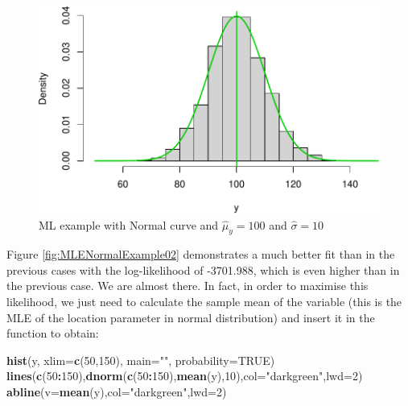 \documentclass[
]{book}
\newenvironment{Shaded}{\begin{snugshade}}{\end{snugshade}}
\newcommand{\DataTypeTok}[1]{\textcolor[rgb]{0.13,0.29,0.53}{#1}}
\newcommand{\DecValTok}[1]{\textcolor[rgb]{0.00,0.00,0.81}{#1}}
\newcommand{\KeywordTok}[1]{\textcolor[rgb]{0.13,0.29,0.53}{\textbf{#1}}}
\newcommand{\NormalTok}[1]{#1}
\newcommand{\OperatorTok}[1]{\textcolor[rgb]{0.81,0.36,0.00}{\textbf{#1}}}
\newcommand{\OtherTok}[1]{\textcolor[rgb]{0.56,0.35,0.01}{#1}}
\newcommand{\StringTok}[1]{\textcolor[rgb]{0.31,0.60,0.02}{#1}}
\theoremstyle{definition}
\theoremstyle{definition}
\theoremstyle{definition}
\theoremstyle{definition}
\theoremstyle{remark}
\begin{document}
\begin{figure}
\centering
\includegraphics{Svetunkov---Statistics-for-Business-Analytics_files/figure-latex/MLENormalExample03-1.pdf}
\caption{\label{fig:MLENormalExample03}ML example with Normal curve and \(\hat{\mu}_y=100\) and \(\hat{\sigma}=10\)}
\end{figure}

Figure \ref{fig:MLENormalExample02} demonstrates a much better fit than in the previous cases with the log-likelihood of -3701.988, which is even higher than in the previous case. We are almost there. In fact, in order to maximise this likelihood, we just need to calculate the sample mean of the variable (this is the MLE of the location parameter in normal distribution) and insert it in the function to obtain:

\begin{Shaded}
\begin{Highlighting}[]
\KeywordTok{hist}\NormalTok{(y, }\DataTypeTok{xlim=}\KeywordTok{c}\NormalTok{(}\DecValTok{50}\NormalTok{,}\DecValTok{150}\NormalTok{), }\DataTypeTok{main=}\StringTok{""}\NormalTok{, }\DataTypeTok{probability=}\OtherTok{TRUE}\NormalTok{)}
\KeywordTok{lines}\NormalTok{(}\KeywordTok{c}\NormalTok{(}\DecValTok{50}\OperatorTok{:}\DecValTok{150}\NormalTok{),}\KeywordTok{dnorm}\NormalTok{(}\KeywordTok{c}\NormalTok{(}\DecValTok{50}\OperatorTok{:}\DecValTok{150}\NormalTok{),}\KeywordTok{mean}\NormalTok{(y),}\DecValTok{10}\NormalTok{),}\DataTypeTok{col=}\StringTok{"darkgreen"}\NormalTok{,}\DataTypeTok{lwd=}\DecValTok{2}\NormalTok{)}
\KeywordTok{abline}\NormalTok{(}\DataTypeTok{v=}\KeywordTok{mean}\NormalTok{(y),}\DataTypeTok{col=}\StringTok{"darkgreen"}\NormalTok{,}\DataTypeTok{lwd=}\DecValTok{2}\NormalTok{)}
\end{Highlighting}
\end{Shaded}
\end{document}
